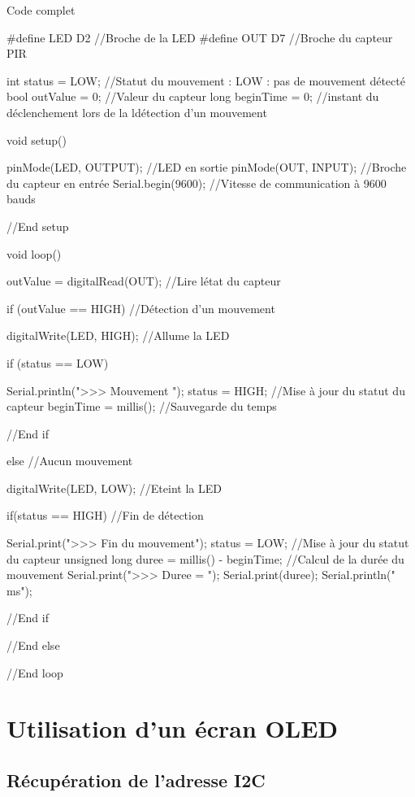 \begin{Cpp}{Code complet}

#define LED D2    //Broche de la LED
#define OUT D7     //Broche du capteur PIR
    
int status = LOW;     //Statut du mouvement : LOW : pas de mouvement détecté
bool outValue = 0;    //Valeur du capteur
long beginTime = 0;   //instant du déclenchement lors de la ldétection d'un mouvement
    
void setup() 
{
      
  pinMode(LED, OUTPUT); //LED en sortie
  pinMode(OUT, INPUT);  //Broche du capteur en entrée
  Serial.begin(9600);   //Vitesse de communication à 9600 bauds

}//End setup
    
void loop(){
    
  outValue = digitalRead(OUT);          //Lire létat du capteur
        
  if (outValue == HIGH)                 //Détection d'un mouvement
  {
    digitalWrite(LED, HIGH);            //Allume la LED
    
    if (status == LOW) 
    {
      Serial.println(">>> Mouvement ");
      status = HIGH;                    //Mise à jour du statut du capteur
      beginTime = millis();             //Sauvegarde du temps                   
    
    }//End if
    
    } 
    else                                //Aucun mouvement
    {
          
      digitalWrite(LED, LOW);           //Eteint la LED
            
      if(status == HIGH)                //Fin de détection
      { 
        Serial.print(">>> Fin du mouvement");
        status = LOW;                               //Mise à jour du statut du capteur
        unsigned long duree = millis() - beginTime; //Calcul de la durée du mouvement
        Serial.print(">>> Duree = ");
        Serial.print(duree);
        Serial.println(" ms");
    
      }//End if
    }//End else
}//End loop
\end{Cpp}

\section{Utilisation d'un écran OLED}


\subsection{Récupération de l'adresse I2C}

